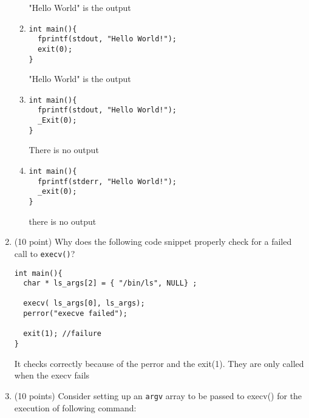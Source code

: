 \documentclass{article}[9pt]
\newenvironment{answerfont}{\fontfamily{qhv}\selectfont}{\par}
\newenvironment{myanswer}{\begin{mdframed}\begin{answerfont}}{\end{answerfont}\end{mdframed}}
\begin{document}
\begin{enumerate}
\begin{enumerate}
  \begin{myanswer}
    "Hello World" is the output
  \end{myanswer}

\item
\begin{verbatim}
int main(){
  fprintf(stdout, "Hello World!");
  exit(0);
}
\end{verbatim}

    \begin{myanswer}
      "Hello World" is the output
  \end{myanswer}

\item
\begin{verbatim}
int main(){
  fprintf(stdout, "Hello World!");
  _Exit(0);
}
\end{verbatim}

  \begin{myanswer}
    There is no output
  \end{myanswer}

\item
\begin{verbatim}
int main(){
  fprintf(stderr, "Hello World!");
  _exit(0);
}
\end{verbatim}

  \begin{myanswer}
    there is no output
  \end{myanswer}

\end{enumerate}

\item (10 point) Why does the following code snippet properly check for a failed
call to \texttt{execv()}?

\begin{verbatim}
int main(){
  char * ls_args[2] = { "/bin/ls", NULL} ;

  execv( ls_args[0], ls_args);
  perror("execve failed");

  exit(1); //failure
}
\end{verbatim}

  \begin{myanswer}
    It checks correctly because of the perror and the exit(1). They are only called when the execv fails
  \end{myanswer}

\item (10 points) Consider setting up an \texttt{argv} array to be passed to execv() for
the execution of following command:


\end{enumerate}
\end{document}
